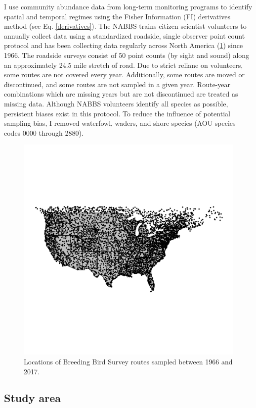 \documentclass[12pt,twoside,openany]{reedthesis}
\begin{document}
I use community abundance data from long-term monitoring programs to
identify spatial and temporal regimes using the Fisher Information (FI)
derivatives method (see Eq. \ref{derivatives}). The NABBS trains citizen
scientist volunteers to annually collect data using a standardized
roadside, single observer point count protocol and has been collecting
data regularly across North America (\ref{fig:bbsPoints}) since 1966.
The roadside surveys consist of 50 point counts (by sight and sound)
along an approximately 24.5 mile stretch of road. Due to strict reliane
on volunteers, some routes are not covered every year. Additionally,
some routes are moved or discontinued, and some routes are not sampled
in a given year. Route-year combinations which are missing years but are
not discontinued are treated as missing data. Although NABBS volunteers
identify all species as possible, persistent biases exist in this
protocol. To reduce the influence of potential sampling bias, I removed
waterfowl, waders, and shore species (AOU species codes 0000 through
2880).
\begin{figure}
\includegraphics[width=0.95\linewidth]{./chapterFiles/fisherSpatial/figures/figsCalledInDiss/bbsRoutesUsed} \caption{Locations of Breeding Bird Survey routes sampled between 1966 and 2017.}\label{fig:bbsPoints}
\end{figure}
\subsection{Study area}\label{study-area}
\end{document}
